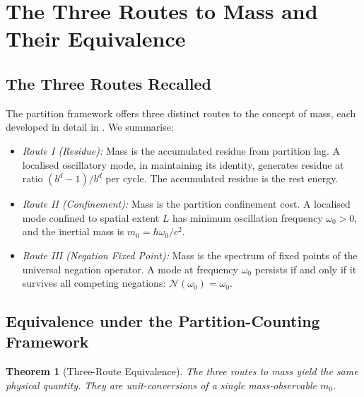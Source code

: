 \documentclass[twocolumn,10pt,a4paper]{article}
\newtheorem{theorem}{Theorem}[section]
\theoremstyle{definition}
\theoremstyle{remark}
\newcommand{\Negation}{\mathcal{N}}
\begin{document}
\section{The Three Routes to Mass and Their Equivalence}
\label{sec:routes}

\subsection{The Three Routes Recalled}

The partition framework offers three distinct routes to the concept of mass, each developed in detail in \citep{sachikonye2025partition}. We summarise:

\begin{itemize}[leftmargin=1.2em,itemsep=0.3em]
    \item \emph{Route I (Residue):} Mass is the accumulated residue from partition lag. A localised oscillatory mode, in maintaining its identity, generates residue at ratio $(b^d - 1)/b^d$ per cycle. The accumulated residue is the rest energy.

    \item \emph{Route II (Confinement):} Mass is the partition confinement cost. A localised mode confined to spatial extent $L$ has minimum oscillation frequency $\omega_0 > 0$, and the inertial mass is $m_0 = \hbar\omega_0/c^2$.

    \item \emph{Route III (Negation Fixed Point):} Mass is the spectrum of fixed points of the universal negation operator. A mode at frequency $\omega_0$ persists if and only if it survives all competing negations: $\Negation(\omega_0) = \omega_0$.
\end{itemize}

\subsection{Equivalence under the Partition-Counting Framework}

\begin{theorem}[Three-Route Equivalence]
\label{thm:three-routes}
The three routes to mass yield the same physical quantity. They are unit-conversions of a single mass-observable $m_0$.
\end{theorem}
\end{document}
